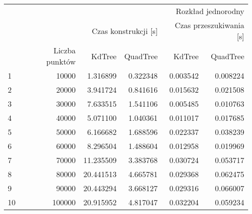 \begin{tabular}{lrrrrr}
\toprule
 & \multicolumn{5}{r}{Rozkład jednorodny} \\
 &  & \multicolumn{2}{r}{Czas konstrukcji [s]} & \multicolumn{2}{r}{Czas przeszukiwania [s]} \\
 & Liczba punktów & KdTree & QuadTree & KdTree & QuadTree \\
\midrule
1 & 10000 & 1.316899 & 0.322348 & 0.003542 & 0.008224 \\
2 & 20000 & 3.941724 & 0.841616 & 0.015632 & 0.021508 \\
3 & 30000 & 7.633515 & 1.541106 & 0.005485 & 0.010763 \\
4 & 40000 & 5.071100 & 1.040361 & 0.011017 & 0.017685 \\
5 & 50000 & 6.166682 & 1.688596 & 0.022337 & 0.038239 \\
6 & 60000 & 8.296504 & 1.488604 & 0.012958 & 0.019969 \\
7 & 70000 & 11.235509 & 3.383768 & 0.030724 & 0.053717 \\
8 & 80000 & 20.441513 & 4.665781 & 0.029368 & 0.062475 \\
9 & 90000 & 20.443294 & 3.668127 & 0.029316 & 0.066007 \\
10 & 100000 & 20.915952 & 4.817047 & 0.032204 & 0.059234 \\
\bottomrule
\end{tabular}
